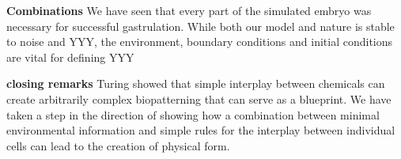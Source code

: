 \textbf{Combinations}
We have seen that every part of the simulated embryo was necessary for successful gastrulation. 
While both our model and nature is stable to noise and YYY, the environment, boundary conditions and initial conditions are vital for defining YYY

\textbf{closing remarks}
Turing showed that simple interplay between chemicals can create arbitrarily complex biopatterning that can serve as a blueprint. We have taken a step in the direction of showing how a combination between minimal environmental information and simple rules for the interplay between individual cells can lead to the creation of physical form. 
